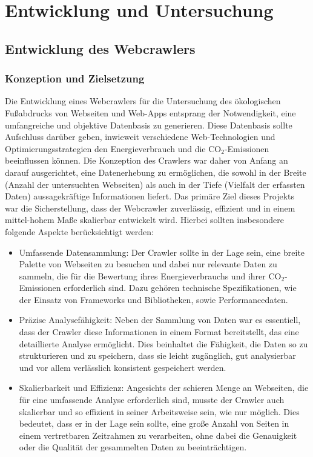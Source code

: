 \documentclass[Bachelor,BIF,german,IEEE]{BASE/twbook}
\begin{document}
\clearpage  


\chapter{Entwicklung und Untersuchung}

\section{Entwicklung des Webcrawlers}

\subsection{Konzeption und Zielsetzung}
\noindent Die Entwicklung eines Webcrawlers für die Untersuchung des ökologischen Fußabdrucks von Webseiten und Web-Apps entsprang der Notwendigkeit, eine umfangreiche und objektive Datenbasis zu generieren. Diese Datenbasis sollte Aufschluss darüber geben, inwieweit verschiedene Web-Technologien und Optimierungsstrategien den Energieverbrauch und die CO$_2$-Emissionen beeinflussen können. Die Konzeption des Crawlers war daher von Anfang an darauf ausgerichtet, eine Datenerhebung zu ermöglichen, die sowohl in der Breite (Anzahl der untersuchten Webseiten) als auch in der Tiefe (Vielfalt der erfassten Daten) aussagekräftige Informationen liefert. Das primäre Ziel dieses Projekts war die Sicherstellung, dass der Webcrawler zuverlässig, effizient und in einem mittel-hohem Maße skalierbar entwickelt wird. Hierbei sollten insbesondere folgende Aspekte berücksichtigt werden:

\begin{itemize}
    \item Umfassende Datensammlung: Der Crawler sollte in der Lage sein, eine breite Palette von Webseiten zu besuchen und dabei nur relevante Daten zu sammeln, die für die Bewertung ihres Energieverbrauchs und ihrer CO$_2$-Emissionen erforderlich sind. Dazu gehören technische Spezifikationen, wie der Einsatz von Frameworks und Bibliotheken, sowie Performancedaten.
    \item Präzise Analysefähigkeit: Neben der Sammlung von Daten war es essentiell, dass der Crawler diese Informationen in einem Format bereitstellt, das eine detaillierte Analyse ermöglicht. Dies beinhaltet die Fähigkeit, die Daten so zu strukturieren und zu speichern, dass sie leicht zugänglich, gut analysierbar und vor allem verlässlich konsistent gespeichert werden.
    \item Skalierbarkeit und Effizienz: Angesichts der schieren Menge an Webseiten, die für eine umfassende Analyse erforderlich sind, musste der Crawler auch skalierbar und so effizient in seiner Arbeitsweise sein, wie nur möglich. Dies bedeutet, dass er in der Lage sein sollte, eine große Anzahl von Seiten in einem vertretbaren Zeitrahmen zu verarbeiten, ohne dabei die Genauigkeit oder die Qualität der gesammelten Daten zu beeinträchtigen.
\end{itemize}
\end{document}
